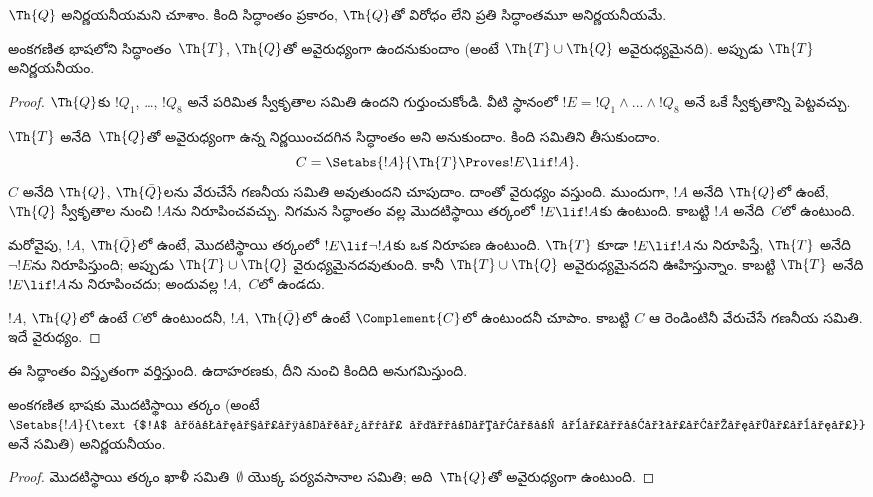 \documentclass[../../../include/open-logic-section]{subfiles}
\begin{document}


$\Th{Q}$ అనిర్ణయనీయమని చూశాం. కింది సిద్ధాంతం ప్రకారం, $\Th{Q}$తో
విరోధం లేని ప్రతి సిద్ధాంతమూ అనిర్ణయనీయమే.

\begin{thm}
అంకగణిత భాషలోని సిద్ధాంతం~$\Th{T}$, $\Th{Q}$తో అవైరుధ్యంగా ఉందనుకుందాం
(అంటే $\Th{T} \cup \Th{Q}$ అవైరుధ్యమైనది). అప్పుడు $\Th{T}$
అనిర్ణయనీయం.
\end{thm}

\begin{proof}
$\Th{Q}$కు $!Q_1$, \dots, $!Q_8$ అనే పరిమిత స్వీకృతాల సమితి ఉందని
గుర్తుంచుకోండి. వీటి స్థానంలో $!E = !Q_1 \land \dots \land !Q_8$ అనే ఒకే
స్వీకృతాన్ని పెట్టవచ్చు.

$\Th{T}$ అనేది~$\Th{Q}$తో అవైరుధ్యంగా ఉన్న నిర్ణయించదగిన సిద్ధాంతం అని
అనుకుందాం. కింది సమితిని తీసుకుందాం.
\[
C = \Setabs{!A}{\Th{T} \Proves !E \lif !A}.
\]
$C$ అనేది $\Th{Q}$, $\Th{\bar Q}$లను వేరుచేసే గణనీయ సమితి అవుతుందని
చూపుదాం. దాంతో వైరుధ్యం వస్తుంది. ముందుగా, $!A$ అనేది $\Th{Q}$లో ఉంటే,
$\Th{Q}$ స్వీకృతాల నుంచి $!A$ను నిరూపించవచ్చు. నిగమన సిద్ధాంతం వల్ల
మొదటిస్థాయి తర్కంలో $!E \lif !A$కు  ఉంటుంది.
కాబట్టి $!A$ అనేది~$C$లో ఉంటుంది.

మరోవైపు, $!A$, $\Th{\bar Q}$లో ఉంటే, మొదటిస్థాయి తర్కంలో $!E \lif
\lnot !A$కు ఒక నిరూపణ ఉంటుంది. $\Th{T}$ కూడా $!E \lif !A$ను నిరూపిస్తే,
$\Th{T}$ అనేది $\lnot !E$ను నిరూపిస్తుంది; అప్పుడు $\Th{T} \cup \Th{Q}$
వైరుధ్యమైనదవుతుంది. కానీ $\Th{T} \cup \Th{Q}$ అవైరుధ్యమైనదని ఊహిస్తున్నాం.
కాబట్టి $\Th{T}$ అనేది $!E \lif !A$ను నిరూపించదు; అందువల్ల $!A$,~$C$లో
ఉండదు.

$!A$, $\Th{Q}$లో ఉంటే $C$లో ఉంటుందనీ, $!A$, $\Th{\bar Q}$లో ఉంటే
$\Complement{C}$లో ఉంటుందనీ చూపాం. కాబట్టి $C$ ఆ రెండింటినీ వేరుచేసే
గణనీయ సమితి. ఇదే వైరుధ్యం.
\end{proof}

ఈ సిద్ధాంతం విస్తృతంగా వర్తిస్తుంది. ఉదాహరణకు, దీని నుంచి కిందిది అనుగమిస్తుంది.

\begin{cor}
  అంకగణిత భాషకు మొదటిస్థాయి తర్కం (అంటే
  $\Setabs{!A}{\text{$!A$ మొదటిస్థాయి తర్కంలో నిరూపించదగినది}}$ అనే సమితి)
  అనిర్ణయనీయం.
\end{cor}

\begin{proof}
మొదటిస్థాయి తర్కం ఖాళీ సమితి~$\emptyset$ యొక్క పర్యవసానాల సమితి;
అది~$\Th{Q}$తో అవైరుధ్యంగా ఉంటుంది.
\end{proof}
\end{document}
